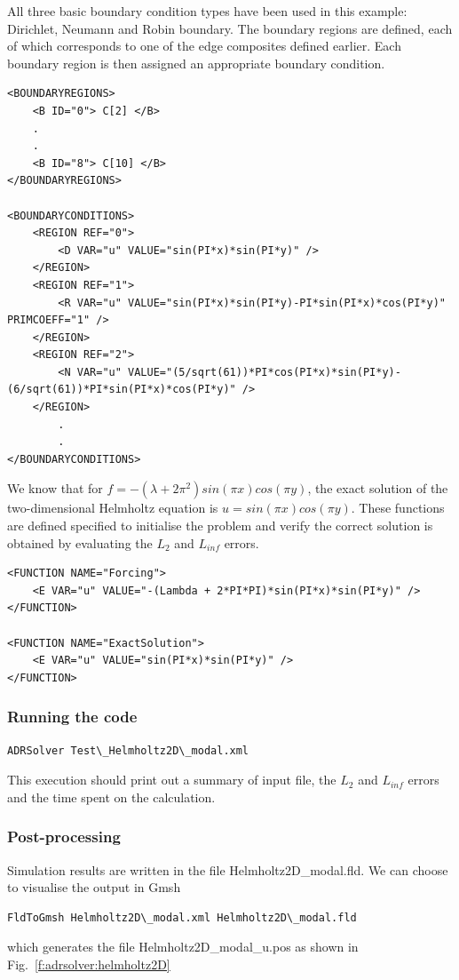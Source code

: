 All three basic boundary condition types have been used in this example:
Dirichlet, Neumann and Robin boundary. The boundary regions are defined, each of
which corresponds to one of the edge composites defined earlier. Each boundary
region is then assigned an appropriate boundary condition.
\begin{lstlisting}[style=XMLStyle]
<BOUNDARYREGIONS>
    <B ID="0"> C[2] </B>
    .
    .
    <B ID="8"> C[10] </B>
</BOUNDARYREGIONS>

<BOUNDARYCONDITIONS>
    <REGION REF="0">
        <D VAR="u" VALUE="sin(PI*x)*sin(PI*y)" />
    </REGION>
    <REGION REF="1">
        <R VAR="u" VALUE="sin(PI*x)*sin(PI*y)-PI*sin(PI*x)*cos(PI*y)" PRIMCOEFF="1" />
    </REGION>
    <REGION REF="2">
        <N VAR="u" VALUE="(5/sqrt(61))*PI*cos(PI*x)*sin(PI*y)-(6/sqrt(61))*PI*sin(PI*x)*cos(PI*y)" />
    </REGION>
        .
        .
</BOUNDARYCONDITIONS>
\end{lstlisting}

We know that for $f = -(\lambda + 2 \pi^2)sin(\pi x)cos(\pi y)$, the exact 
solution of the two-dimensional Helmholtz equation is $u = sin(\pi x)cos(\pi
y)$. These functions are defined specified to initialise the problem and verify
the correct solution is obtained by evaluating the $L_2$ and $L_{inf}$ errors.
\begin{lstlisting}[style=XMLStyle]
<FUNCTION NAME="Forcing">
    <E VAR="u" VALUE="-(Lambda + 2*PI*PI)*sin(PI*x)*sin(PI*y)" />
</FUNCTION>

<FUNCTION NAME="ExactSolution">
    <E VAR="u" VALUE="sin(PI*x)*sin(PI*y)" />
</FUNCTION>
\end{lstlisting}


\subsubsection{Running the code}
\begin{lstlisting}[style=BashInputStyle]
ADRSolver Test\_Helmholtz2D\_modal.xml
\end{lstlisting}

This execution should print out a summary of input file, the $L_2$ and 
$L_{inf}$ errors and the time spent on the calculation.

\subsubsection{Post-processing}
Simulation results are written in the file Helmholtz2D\_modal.fld. We can choose
to visualise the output in Gmsh
\begin{lstlisting}[style=BashInputStyle]
FldToGmsh Helmholtz2D\_modal.xml Helmholtz2D\_modal.fld
\end{lstlisting}
which generates the file Helmholtz2D\_modal\_u.pos as shown in
Fig.~\ref{f:adrsolver:helmholtz2D}

